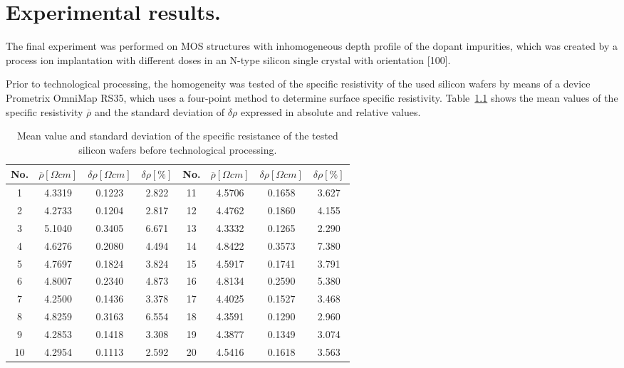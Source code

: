 \chapter{Experimental results.}\label{Chapter7}

The final experiment was performed on MOS structures with
inhomogeneous depth profile of the dopant impurities, which was
created by a process ion implantation with different doses in an
N-type silicon single crystal with orientation [100].

Prior to technological processing, the homogeneity was tested of the
specific resistivity of the used silicon wafers by means of a device
Prometrix OmniMap RS35, which uses a four-point method to determine
surface specific resistivity. Table~\ref{tab:7.1} shows the mean
values of the specific resistivity $\overline\rho$ and the standard
deviation of $\delta\rho$ expressed in absolute and relative values.

\begin{table}[h!]\centering
  \begin{minipage}[c]{\myfiguresize}
    \begin{center}
      \begin{tabular}{c c c c c c c c}
        No. & $\overline\rho[\Omega cm]$ & $\delta\rho[\Omega cm]$ & $\delta\rho[\%]$ &
        No. & $\overline\rho[\Omega cm]$ & $\delta\rho[\Omega cm]$ & $\delta\rho[\%]$\\
        \hline%
        1 & 4.3319 & 0.1223 & 2.822 & 11 & 4.5706 & 0.1658 & 3.627\\
        2 & 4.2733 & 0.1204 & 2.817 & 12 & 4.4762 & 0.1860 & 4.155\\
        3 & 5.1040 & 0.3405 & 6.671 & 13 & 4.3332 & 0.1265 & 2.290\\
        4 & 4.6276 & 0.2080 & 4.494 & 14 & 4.8422 & 0.3573 & 7.380\\
        5 & 4.7697 & 0.1824 & 3.824 & 15 & 4.5917 & 0.1741 & 3.791\\
        6 & 4.8007 & 0.2340 & 4.873 & 16 & 4.8134 & 0.2590 & 5.380\\
        7 & 4.2500 & 0.1436 & 3.378 & 17 & 4.4025 & 0.1527 & 3.468\\
        8 & 4.8259 & 0.3163 & 6.554 & 18 & 4.3591 & 0.1290 & 2.960\\
        9 & 4.2853 & 0.1418 & 3.308 & 19 & 4.3877 & 0.1349 & 3.074\\
        10 & 4.2954 & 0.1113 & 2.592 & 20 & 4.5416 & 0.1618 & 3.563\\
      \end{tabular}
    \end{center}
    \caption[Mean and standard deviation of specific resistance of the
      tested silicon wafers before technological processing]{Mean
      value and standard deviation of the specific resistance of the
      tested silicon wafers before technological
      processing.}\label{tab:7.1}
  \end{minipage}
\end{table}

